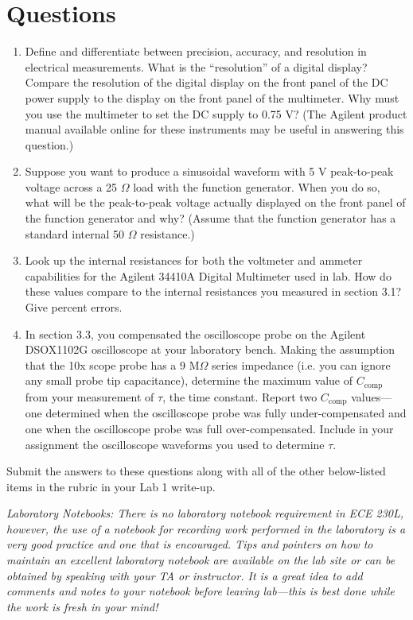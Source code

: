 \documentclass[12pt]{../manual}
\begin{document}
\section{Questions}
\begin{enumerate}
\item Define and differentiate between precision, accuracy, and resolution in electrical measurements. What is the ``resolution'' of a digital display? Compare the resolution of the digital display on the front panel of the DC power supply to the display on the front panel of the multimeter. Why must you use the multimeter to set the DC supply to 0.75 V? (The Agilent product manual available online for these instruments may be useful in answering this question.)
\item Suppose you want to produce a sinusoidal waveform with 5 V peak-to-peak voltage across a 25 $\Omega$ load with the function generator. When you do so, what will be the peak-to-peak voltage actually displayed on the front panel of the function generator and why? (Assume that the function generator has a standard internal 50 $\Omega$ resistance.)
\item Look up the internal resistances for both the voltmeter and ammeter capabilities for the Agilent 34410A Digital Multimeter used in lab. How do these values compare to the internal resistances you measured in section 3.1? Give percent errors.
\item In section 3.3, you compensated the oscilloscope probe on the Agilent DSOX1102G oscilloscope at your laboratory bench.  Making the assumption that the 10x scope probe has a 9 M$\Omega$ series impedance (i.e. you can ignore any small probe tip capacitance), determine the maximum value of $C_{\mathrm{comp}}$ from your measurement of $\tau$, the time constant.  Report two $C_{\mathrm{comp}}$ values---one determined when the oscilloscope probe was fully under-compensated and one when the oscilloscope probe was full over-compensated.  Include in your assignment the oscilloscope waveforms you used to determine $\tau$. 
\end{enumerate}

Submit the answers to these questions along with all of the other below-listed items in the rubric in your Lab 1 write-up. 

 \textit{Laboratory Notebooks:  There is no laboratory notebook requirement in ECE 230L, however, the use of a notebook for recording work performed in the laboratory is a very good practice and one that is encouraged.  Tips and pointers on how to maintain an excellent laboratory notebook are available on the lab site or can be obtained by speaking with your TA or instructor. It is a great idea to add comments and notes to your notebook before leaving lab---this is best done while the work is fresh in your mind!}
%
\newpage
{}
\end{document}
